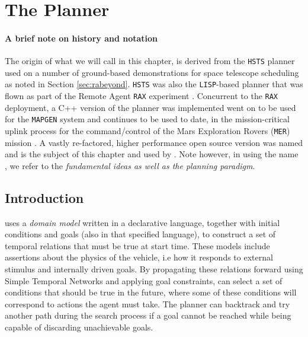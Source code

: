 \section{The \eu Planner }
\label{sec:basics}

\paragraph {A brief note on \eu history and notation} The origin of
what we will call \eu in this chapter, is derived from the
\texttt{HSTS} planner \cite{mus94} used on a number of ground-based
demonstrations for space telescope scheduling as noted in Section
\ref{sec:rabeyond}. \texttt{HSTS} was also the \texttt{LISP}-based
planner that was flown as part of the Remote Agent \texttt{RAX}
experiment \cite{mus98}. Concurrent to the \texttt{RAX} deployment, a
C++ version of the planner was implemented  went on to be used for the \texttt{MAPGEN} system and
continues to be used to date, in the mission-critical uplink process
for the command/control of the Mars Exploration Rovers (\texttt{MER})
mission \cite{bresina05}. A vastly re-factored, higher performance
open source version was named \eut \cite{europapso} and is the subject
of this chapter and used by \rxe.  Note however, in using the name
\eue, we refer to the \emph{fundamental ideas as well as the planning
  paradigm}.

\subsection{Introduction}
\label{sec:euintro}

\eu uses a \emph{domain model} 
written in a declarative language, together with initial conditions
and goals (also in that specified language), to construct a set of
temporal relations that must be true at start time. These models
include assertions about the physics of the vehicle, i.e how it
responds to external stimulus and internally driven goals. By
propagating these relations forward using Simple Temporal Networks
\cite{dechter91} and applying goal constraints, \eu can select a set
of conditions that should be true in the future, where some of these
conditions will correspond to actions the agent must take. The planner
can backtrack and try another path during the search process if a goal
cannot be reached while being capable of discarding unachievable
goals.

